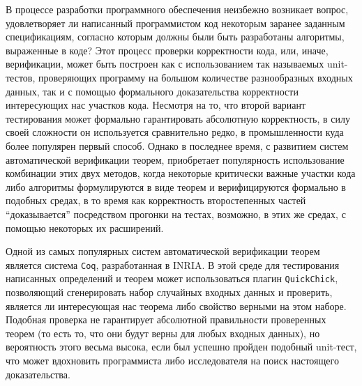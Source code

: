 



\usepackage{fancyvrb}
\usepackage{tikz}
\usepackage{float}
\usetikzlibrary{arrows}



\DeclareMathOperator{\bttr}{T\_tr}
\DeclareMathOperator{\btnil}{T\_nil}

\newcommand{\tbttr}{T\_tr}
\newcommand{\tcoq}{\texttt{Coq}}
\newcommand{\tqc}{\texttt{QuickChick}}


\Intro

В процессе разработки программного обеспечения неизбежно возникает вопрос, удовлетворяет ли написанный программистом код некоторым заранее заданным спецификациям, согласно которым должны были быть разработаны алгоритмы, выраженные в коде? Этот процесс проверки корректности кода, или, иначе, верификации, может быть построен как с использованием так называемых unit-тестов, проверяющих программу на большом количестве разнообразных входных данных, так и с помощью формального доказательства корректности интересующих нас участков кода. Несмотря на то, что второй вариант тестирования может формально гарантировать абсолютную корректность, в силу своей сложности он используется сравнительно редко, в промышленности куда более популярен первый способ. Однако в последнее время, с развитием систем автоматической верификации теорем, приобретает популярность использование комбинации этих двух методов, когда некоторые критически важные участки кода либо алгоритмы формулируются в виде теорем и верифицируются формально в подобных средах, в то время как корректность второстепенных частей ``доказывается'' посредством прогонки на тестах, возможно, в этих же средах, с помощью некоторых их расширений.

Одной из самых популярных систем автоматической верификации теорем является система \tcoq, разработанная в INRIA. В этой среде для тестирования написанных определений и теорем может использоваться плагин \tqc, позволяющий сгенерировать набор случайных входных данных и проверить, является ли интересующая нас теорема либо свойство верными на этом наборе. Подобная проверка не гарантирует абсолютной правильности проверенных теорем (то есть то, что они будут верны для любых входных данных), но вероятность этого весьма высока, если был успешно пройден подобный unit-тест, что может вдохновить программиста либо исследователя на поиск настоящего доказательства.

